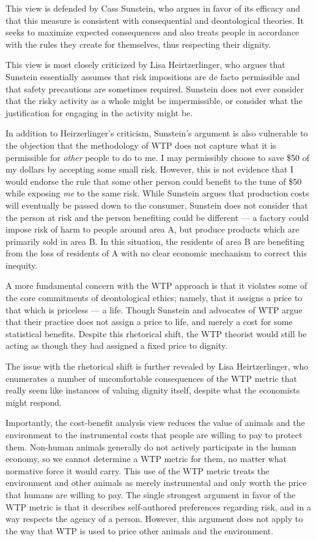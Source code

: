 This view is defended by Cass Sunstein, who argues in favor of its efficacy and
that this measure is consistent with consequential and deontological theories.
It seeks to maximize expected consequences and also treats people in accordance
with the rules they create for themselves, thus respecting their
dignity.\autocite{sunstein_cost_benefit}

This view is
most closely criticized by Lisa Heirtzerlinger, who argues that Sunstein
essentially assumes that risk impositions are de facto permissible and that
safety precautions are sometimes required. Sunstein does not ever consider that
the risky activity as a whole might be impermissible, or consider what the
justification for engaging in the activity might be.

In addition to Heirzerlinger’s criticism, Sunstein’s argument is also
vulnerable to the objection that the methodology of WTP does not capture what
it is permissible for \emph{other} people to do to me. I may permissibly choose
to save \$50 of my dollars by accepting some small risk. However, this is not
evidence that I would endorse the rule that some other person could benefit to
the tune of \$50 while exposing \emph{me} to the same
risk.\autocite[98]{hansson_risk} While Sunstein argues that production costs
will eventually be passed down to the consumer, Sunstein does not consider that
the person at risk and the person benefiting could be different --- a factory
could impose risk of harm to people around area A, but produce products which
are primarily sold in area B. In this situation, the residents of area B are
benefiting from the loss of residents of A with no clear economic mechanism to
correct this inequity.

A more fundamental concern with the WTP approach is that it violates some of
the core commitments of deontological ethics; namely, that it assigns a price
to that which is priceless --- a life. Though Sunstein and advocates of WTP
argue that their practice does not assign a price to life, and merely a cost
for some statistical benefits. Despite this rhetorical shift, the WTP theorist
would still be acting as though they had assigned a fixed price to
dignity.\autocite{kant_uncertainty}

The issue with the rhetorical shift is further revealed by Lisa Heirtzerlinger,
who enumerates a number of uncomfortable consequences of the WTP metric that
really seem like instances of valuing dignity itself, despite what the
economists might respond.

Importantly, the cost-benefit analysis view reduces the value of animals and
the environment to the instrumental costs that people are willing to pay to
protect them. Non-human animals generally do not actively participate in the
human economy, so we cannot determine a WTP metric for them, no matter what
normative force it would carry. This use of the WTP metric treats the
environment and other animals as merely instrumental and only worth the price
that humans are willing to pay. The single strongest argument in favor of the
WTP metric is that it describes self-authored preferences regarding risk, and
in a way respects the agency of a person. However, this argument does not apply
to the way that WTP is used to price other animals and the environment.

